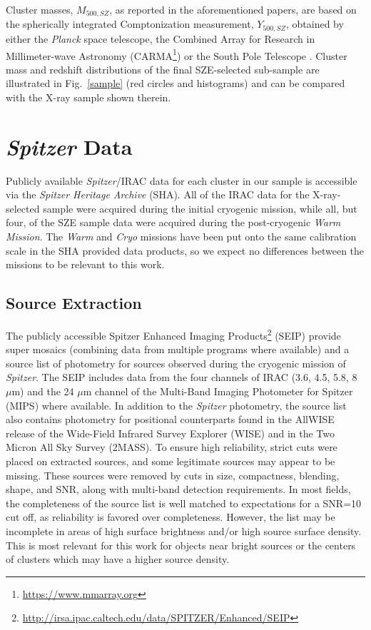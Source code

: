 \documentclass[apj,twocolumn]{emulateapj}
\begin{document}
{Cluster masses, $M_{500, SZ}$, as reported in the aforementioned papers, are based on the spherically integrated Comptonization measurement, $Y_{500, SZ}$, obtained by either the {\it Planck} space telescope, the Combined Array for Research in Millimeter-wave Astronomy (CARMA\footnote{\url{https://www.mmarray.org}}) or the South Pole Telescope \citep[SPT;][]{Carlstrom11, Austermann12, Story13}.
Cluster mass and redshift distributions of the final SZE-selected sub-sample are illustrated in Fig.~\ref{sample} (red circles and histograms) and can be compared with the X-ray sample shown therein.

\section{{\it Spitzer} Data}

Publicly available {\it Spitzer}/IRAC data for each cluster in our sample is accessible via the {\it Spitzer Heritage Archive} (SHA).  All of the IRAC data for the X-ray-selected sample were acquired during the initial cryogenic mission, while all, but four, of the SZE sample data were acquired during the post-cryogenic {\it Warm Mission}. The {\it Warm} and {\it Cryo} missions have been put onto the same calibration scale in the SHA provided data products, so we expect no differences between the missions to be relevant to this work.

\subsection{Source Extraction}

The publicly accessible  Spitzer Enhanced Imaging Products\footnote{\url{http://irsa.ipac.caltech.edu/data/SPITZER/Enhanced/SEIP}} (SEIP) provide super mosaics (combining data from multiple programs where available) and a source list of photometry for  sources observed during the cryogenic mission of {\it Spitzer}. The SEIP includes data from the four channels of IRAC (3.6, 4.5, 5.8, 8 $\mu$m) and the 24 $\mu$m channel of the Multi-Band Imaging Photometer for Spitzer (MIPS) where available.  In addition to the {\it Spitzer} photometry, the source list also contains photometry for positional counterparts found in the AllWISE release of the Wide-Field Infrared Survey Explorer (WISE) and in the Two Micron All Sky Survey (2MASS). To ensure high reliability, strict cuts were placed on extracted sources, and some legitimate sources may appear to be missing. These sources were removed by cuts in size, compactness, blending, shape, and SNR, along with multi-band detection requirements. In most fields, the completeness of the source list is well matched to expectations for a SNR=10 cut off, as reliability is favored over completeness. However, the list may be incomplete in areas of high surface brightness and/or high source surface density.  This is most relevant for this work for objects near bright sources or the centers of clusters which may have a higher source density.

}
\end{document}
